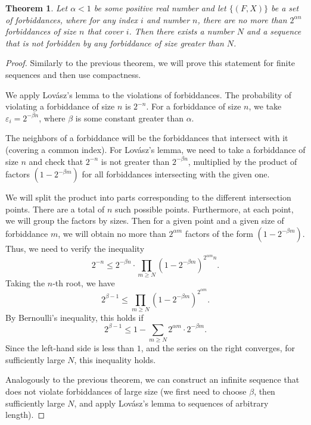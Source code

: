 \documentclass[12pt,sans]{article}
\theoremstyle{definition}
\theoremstyle{plain}
\newtheorem{theorem}{Theorem}[section]
\theoremstyle{remark}
\begin{document}
\begin{theorem}\label{thm:lll:subseq}
    Let $\alpha < 1$ be some positive real number and let
    $\{(F,X)\}$ be a set of forbiddances, where for any index $i$
    and number $n$, there are no more than $2^{\alpha n}$ forbiddances of size $n$
    that cover $i$. Then there exists a number $N$ and a sequence
    that is not forbidden by any forbiddance of size greater than $N$.
\end{theorem}
\begin{proof}
    Similarly to the previous theorem, we will prove this statement for
    finite sequences and then use compactness.

    We apply Lovász's lemma to the violations of forbiddances.
    The probability of violating a forbiddance of size $n$ is $2^{-n}$.
    For a forbiddance of size $n$, we take $\varepsilon_i = 2^{-\beta n}$,
    where $\beta$ is some constant greater than $\alpha$.

    The neighbors of a forbiddance will be the forbiddances that intersect with it (covering a common index).
    For Lovász's lemma, we need to take a forbiddance of size $n$ and check that $2^{-n}$ is not greater than $2^{-\beta n}$,
    multiplied by the product of factors $(1-2^{-\beta m})$ for all forbiddances intersecting with the given one.

    We will split the product into parts corresponding to the different intersection points.
    There are a total of $n$ such possible points. Furthermore, at each point, we will group the factors
    by sizes. Then for a given point and a given size of forbiddance $m$, we will obtain no more than
    $2^{\alpha m}$ factors of the form $(1-2^{-\beta m})$. Thus, we need to verify the inequality
    \[
    2^{-n}\le 2^{-\beta n}\cdot\prod_{m\ge N} (1-2^{-\beta m})^{2^{\alpha m}n}.
    \]
    Taking the $n$-th root, we have
    \[
    2^{\beta-1}\le \prod_{m\ge N} (1-2^{-\beta m})^{2^{\alpha m}}.
    \]
    By Bernoulli's inequality, this holds if
    \[
    2^{\beta-1}\le 1 - \sum_{m\ge N} 2^{\alpha m}\cdot 2^{-\beta m}.
    \]
    Since the left-hand side is less than $1$, and the series on the right converges, for
    sufficiently large $N$, this inequality holds.

    Analogously to the previous theorem, we can construct an infinite sequence
    that does not violate forbiddances of large size (we first need to choose $\beta$, then
    sufficiently large $N$, and apply Lovász's lemma to sequences
    of arbitrary length).
\end{proof}
\end{document}
